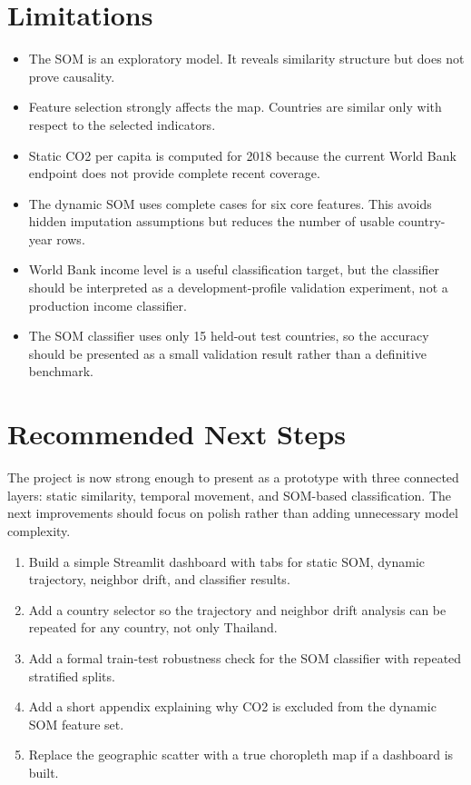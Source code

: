 \documentclass[11pt,a4paper]{article}
\begin{document}
\section{Limitations}

\begin{itemize}
  \item The SOM is an exploratory model. It reveals similarity structure but does not prove causality.
  \item Feature selection strongly affects the map. Countries are similar only with respect to the selected indicators.
  \item Static CO2 per capita is computed for 2018 because the current World Bank endpoint does not provide complete recent coverage.
  \item The dynamic SOM uses complete cases for six core features. This avoids hidden imputation assumptions but reduces the number of usable country-year rows.
  \item World Bank income level is a useful classification target, but the classifier should be interpreted as a development-profile validation experiment, not a production income classifier.
  \item The SOM classifier uses only 15 held-out test countries, so the accuracy should be presented as a small validation result rather than a definitive benchmark.
\end{itemize}

\section{Recommended Next Steps}

The project is now strong enough to present as a prototype with three connected layers: static similarity, temporal movement, and SOM-based classification. The next improvements should focus on polish rather than adding unnecessary model complexity.

\begin{enumerate}
  \item Build a simple Streamlit dashboard with tabs for static SOM, dynamic trajectory, neighbor drift, and classifier results.
  \item Add a country selector so the trajectory and neighbor drift analysis can be repeated for any country, not only Thailand.
  \item Add a formal train-test robustness check for the SOM classifier with repeated stratified splits.
  \item Add a short appendix explaining why CO2 is excluded from the dynamic SOM feature set.
  \item Replace the geographic scatter with a true choropleth map if a dashboard is built.
\end{enumerate}
\end{document}
